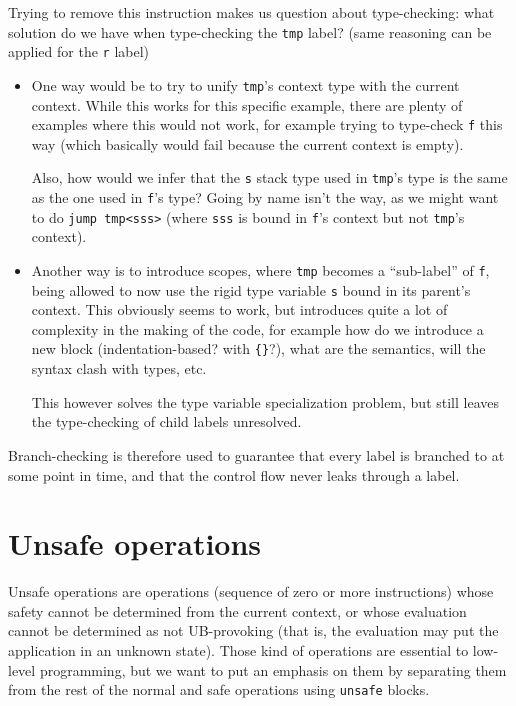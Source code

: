 Trying to remove this instruction makes us question about type-checking: what solution do we have when type-checking the \texttt{tmp} label? (same reasoning can be applied for the \texttt{r} label)
\begin{itemize}
  \item
        One way would be to try to unify \texttt{tmp}'s context type with the current context.
        While this works for this specific example, there are plenty of examples where this would not work, for example trying to type-check \texttt{f} this way (which basically would fail because the current context is empty).

        Also, how would we infer that the \texttt{s} stack type used in \texttt{tmp}'s type is the same as the one used in \texttt{f}'s type?
        Going by name isn't the way, as we might want to do \texttt{jump tmp<sss>} (where \texttt{sss} is bound in \texttt{f}'s context but not \texttt{tmp}'s context).
  \item
        Another way is to introduce scopes, where \texttt{tmp} becomes a ``sub-label'' of \texttt{f}, being allowed to now use the rigid type variable \texttt{s} bound in its parent's context.
        This obviously seems to work, but introduces quite a lot of complexity in the making of the code, for example how do we introduce a new block (indentation-based? with \texttt{\{\}}?), what are the semantics, will the syntax clash with types, etc.

        This however solves the type variable specialization problem, but still leaves the type-checking of child labels unresolved.
\end{itemize}

Branch-checking is therefore used to guarantee that every label is branched to at some point in time, and that the control flow never leaks through a label.

\section{Unsafe operations}\label{sec:nstar-common-unsafe}

Unsafe operations are operations (sequence of zero or more instructions) whose safety cannot be determined from the current context, or whose evaluation cannot be determined as not UB-provoking (that is, the evaluation may put the application in an unknown state).
Those kind of operations are essential to low-level programming, but we want to put an emphasis on them by separating them from the rest of the normal and safe operations using \texttt{unsafe} blocks.

